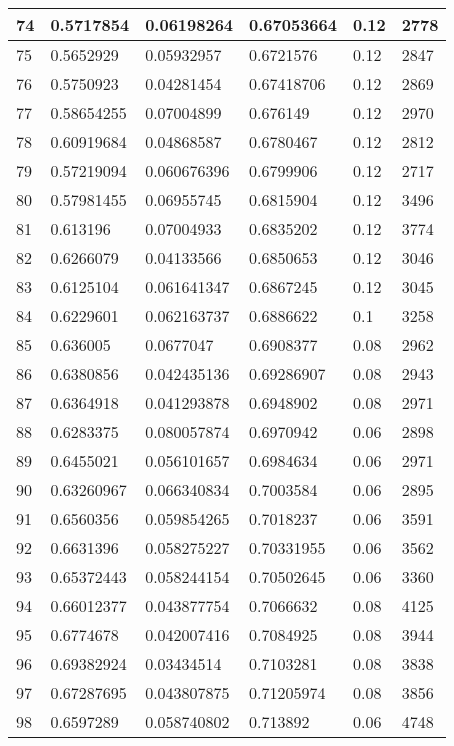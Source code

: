 \begin{longtable}{|l|l|l|l|l|l|}
74 & 0.5717854 & 0.06198264 & 0.67053664 & 0.12 & 2778 \\ \hline 
75 & 0.5652929 & 0.05932957 & 0.6721576 & 0.12 & 2847 \\ \hline 
76 & 0.5750923 & 0.04281454 & 0.67418706 & 0.12 & 2869 \\ \hline 
77 & 0.58654255 & 0.07004899 & 0.676149 & 0.12 & 2970 \\ \hline 
78 & 0.60919684 & 0.04868587 & 0.6780467 & 0.12 & 2812 \\ \hline 
79 & 0.57219094 & 0.060676396 & 0.6799906 & 0.12 & 2717 \\ \hline 
80 & 0.57981455 & 0.06955745 & 0.6815904 & 0.12 & 3496 \\ \hline 
81 & 0.613196 & 0.07004933 & 0.6835202 & 0.12 & 3774 \\ \hline 
82 & 0.6266079 & 0.04133566 & 0.6850653 & 0.12 & 3046 \\ \hline 
83 & 0.6125104 & 0.061641347 & 0.6867245 & 0.12 & 3045 \\ \hline 
84 & 0.6229601 & 0.062163737 & 0.6886622 & 0.1 & 3258 \\ \hline 
85 & 0.636005 & 0.0677047 & 0.6908377 & 0.08 & 2962 \\ \hline 
86 & 0.6380856 & 0.042435136 & 0.69286907 & 0.08 & 2943 \\ \hline 
87 & 0.6364918 & 0.041293878 & 0.6948902 & 0.08 & 2971 \\ \hline 
88 & 0.6283375 & 0.080057874 & 0.6970942 & 0.06 & 2898 \\ \hline 
89 & 0.6455021 & 0.056101657 & 0.6984634 & 0.06 & 2971 \\ \hline 
90 & 0.63260967 & 0.066340834 & 0.7003584 & 0.06 & 2895 \\ \hline 
91 & 0.6560356 & 0.059854265 & 0.7018237 & 0.06 & 3591 \\ \hline 
92 & 0.6631396 & 0.058275227 & 0.70331955 & 0.06 & 3562 \\ \hline 
93 & 0.65372443 & 0.058244154 & 0.70502645 & 0.06 & 3360 \\ \hline 
94 & 0.66012377 & 0.043877754 & 0.7066632 & 0.08 & 4125 \\ \hline 
95 & 0.6774678 & 0.042007416 & 0.7084925 & 0.08 & 3944 \\ \hline 
96 & 0.69382924 & 0.03434514 & 0.7103281 & 0.08 & 3838 \\ \hline 
97 & 0.67287695 & 0.043807875 & 0.71205974 & 0.08 & 3856 \\ \hline 
98 & 0.6597289 & 0.058740802 & 0.713892 & 0.06 & 4748 \\ \hline 

\end{longtable}
